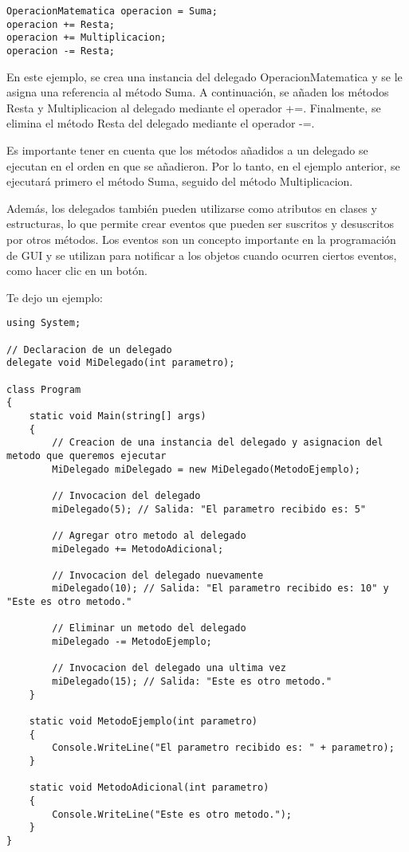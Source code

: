 \documentclass[executivepaper]{article}
\begin{document}
\begin{lstlisting}
OperacionMatematica operacion = Suma;
operacion += Resta;
operacion += Multiplicacion;
operacion -= Resta;
\end{lstlisting}

En este ejemplo, se crea una instancia del delegado OperacionMatematica y se le asigna una referencia al método Suma. A continuación, se añaden los métodos Resta y Multiplicacion al delegado mediante el operador +=. Finalmente, se elimina el método Resta del delegado mediante el operador -=.

Es importante tener en cuenta que los métodos añadidos a un delegado se ejecutan en el orden en que se añadieron. Por lo tanto, en el ejemplo anterior, se ejecutará primero el método Suma, seguido del método Multiplicacion.

Además, los delegados también pueden utilizarse como atributos en clases y estructuras, lo que permite crear eventos que pueden ser suscritos y desuscritos por otros métodos. Los eventos son un concepto importante en la programación de GUI y se utilizan para notificar a los objetos cuando ocurren ciertos eventos, como hacer clic en un botón.

Te dejo un ejemplo:

\begin{lstlisting}
using System;

// Declaracion de un delegado
delegate void MiDelegado(int parametro);

class Program
{
    static void Main(string[] args)
    {
        // Creacion de una instancia del delegado y asignacion del metodo que queremos ejecutar
        MiDelegado miDelegado = new MiDelegado(MetodoEjemplo);

        // Invocacion del delegado
        miDelegado(5); // Salida: "El parametro recibido es: 5"

        // Agregar otro metodo al delegado
        miDelegado += MetodoAdicional;

        // Invocacion del delegado nuevamente
        miDelegado(10); // Salida: "El parametro recibido es: 10" y "Este es otro metodo."

        // Eliminar un metodo del delegado
        miDelegado -= MetodoEjemplo;

        // Invocacion del delegado una ultima vez
        miDelegado(15); // Salida: "Este es otro metodo."
    }

    static void MetodoEjemplo(int parametro)
    {
        Console.WriteLine("El parametro recibido es: " + parametro);
    }

    static void MetodoAdicional(int parametro)
    {
        Console.WriteLine("Este es otro metodo.");
    }
}    
\end{lstlisting}
\end{document}

